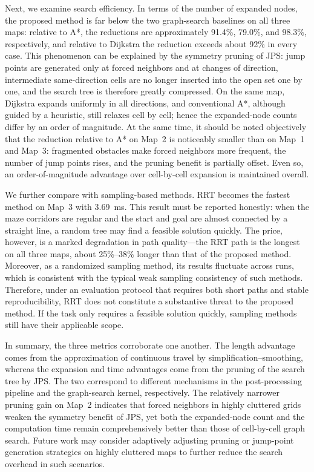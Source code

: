 \documentclass[lettersize,journal]{IEEEtran}
\begin{document}
Next, we examine search efficiency. In terms of the number of expanded nodes, the proposed method is far below the two graph-search baselines on all three maps: relative to A*, the reductions are approximately 91.4\%, 79.0\%, and 98.3\%, respectively, and relative to Dijkstra the reduction exceeds about 92\% in every case. This phenomenon can be explained by the symmetry pruning of JPS: jump points are generated only at forced neighbors and at changes of direction, intermediate same-direction cells are no longer inserted into the open set one by one, and the search tree is therefore greatly compressed. On the same map, Dijkstra expands uniformly in all directions, and conventional A*, although guided by a heuristic, still relaxes cell by cell; hence the expanded-node counts differ by an order of magnitude. At the same time, it should be noted objectively that the reduction relative to A* on Map~2 is noticeably smaller than on Map~1 and Map~3: fragmented obstacles make forced neighbors more frequent, the number of jump points rises, and the pruning benefit is partially offset. Even so, an order-of-magnitude advantage over cell-by-cell expansion is maintained overall.

We further compare with sampling-based methods. RRT becomes the fastest method on Map~3 with 3.69~ms. This result must be reported honestly: when the maze corridors are regular and the start and goal are almost connected by a straight line, a random tree may find a feasible solution quickly. The price, however, is a marked degradation in path quality---the RRT path is the longest on all three maps, about 25\%--38\% longer than that of the proposed method. Moreover, as a randomized sampling method, its results fluctuate across runs, which is consistent with the typical weak sampling consistency of such methods. Therefore, under an evaluation protocol that requires both short paths and stable reproducibility, RRT does not constitute a substantive threat to the proposed method. If the task only requires a feasible solution quickly, sampling methods still have their applicable scope.

In summary, the three metrics corroborate one another. The length advantage comes from the approximation of continuous travel by simplification--smoothing, whereas the expansion and time advantages come from the pruning of the search tree by JPS. The two correspond to different mechanisms in the post-processing pipeline and the graph-search kernel, respectively. The relatively narrower pruning gain on Map~2 indicates that forced neighbors in highly cluttered grids weaken the symmetry benefit of JPS, yet both the expanded-node count and the computation time remain comprehensively better than those of cell-by-cell graph search. Future work may consider adaptively adjusting pruning or jump-point generation strategies on highly cluttered maps to further reduce the search overhead in such scenarios.
\end{document}
